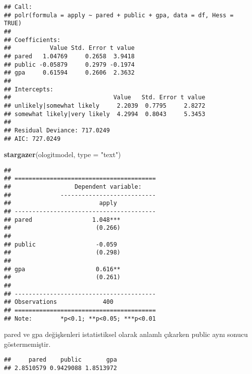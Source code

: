 \documentclass[
]{book}
\newenvironment{Shaded}{\begin{snugshade}}{\end{snugshade}}
\newcommand{\CommentTok}[1]{\textcolor[rgb]{0.56,0.35,0.01}{\textit{#1}}}
\newcommand{\DataTypeTok}[1]{\textcolor[rgb]{0.13,0.29,0.53}{#1}}
\newcommand{\KeywordTok}[1]{\textcolor[rgb]{0.13,0.29,0.53}{\textbf{#1}}}
\newcommand{\NormalTok}[1]{#1}
\newcommand{\OperatorTok}[1]{\textcolor[rgb]{0.81,0.36,0.00}{\textbf{#1}}}
\newcommand{\StringTok}[1]{\textcolor[rgb]{0.31,0.60,0.02}{#1}}
\begin{document}
\begin{verbatim}
## Call:
## polr(formula = apply ~ pared + public + gpa, data = df, Hess = TRUE)
## 
## Coefficients:
##           Value Std. Error t value
## pared   1.04769     0.2658  3.9418
## public -0.05879     0.2979 -0.1974
## gpa     0.61594     0.2606  2.3632
## 
## Intercepts:
##                             Value   Std. Error t value
## unlikely|somewhat likely     2.2039  0.7795     2.8272
## somewhat likely|very likely  4.2994  0.8043     5.3453
## 
## Residual Deviance: 717.0249 
## AIC: 727.0249
\end{verbatim}

\begin{Shaded}
\begin{Highlighting}[]
\KeywordTok{stargazer}\NormalTok{(ologitmodel, }\DataTypeTok{type =} \StringTok{"text"}\NormalTok{)}
\end{Highlighting}
\end{Shaded}

\begin{verbatim}
## 
## ========================================
##                  Dependent variable:    
##              ---------------------------
##                         apply           
## ----------------------------------------
## pared                 1.048***          
##                        (0.266)          
##                                         
## public                 -0.059           
##                        (0.298)          
##                                         
## gpa                    0.616**          
##                        (0.261)          
##                                         
## ----------------------------------------
## Observations             400            
## ========================================
## Note:        *p<0.1; **p<0.05; ***p<0.01
\end{verbatim}

pared ve gpa değişkenleri istatistiksel olarak anlamlı çıkarken public aynı sonucu göstermemiştir.

\begin{Shaded}
\end{Shaded}

\begin{verbatim}
##     pared    public       gpa 
## 2.8510579 0.9429088 1.8513972
\end{verbatim}
\end{document}
